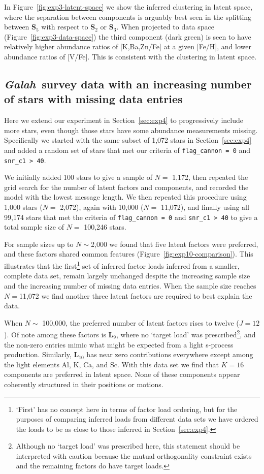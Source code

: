 \documentclass[twocolumn]{aastex62}
\newcommand{\project}[1]{\textsl{#1}}
\newcommand{\Galah}{\project{Galah}}
\newcommand{\factorloads}{\textbf{L}}
\newcommand{\factorscores}{\textbf{S}}
\begin{document}
In Figure~\ref{fig:exp3-latent-space} we show the inferred clustering in latent space,
where the separation between components is arguably best seen in the splitting between $\factorscores_5$ with respect to $\factorscores_2$ or $\factorscores_3$. When projected to data space (Figure~\ref{fig:exp3-data-space}) the third component (dark green) is seen to have relatively higher abundance ratios of [K,Ba,Zn/Fe] at a given [Fe/H],
and lower abundance ratios of [V/Fe]. This is consistent with the clustering in latent space.


\subsection{\Galah\ survey data with an increasing number of stars with missing data entries} \label{sec:exp10}
Here we extend our experiment in Section~\ref{sec:exp4} to progressively
include more stars, even though those stars have some abundance measurements
missing. 
Specifically we started with the same subset of 1,072 stars in Section~\ref{sec:exp4}
and added a random set of stars that met our criteria of \texttt{flag\_cannon = 0} and
\texttt{snr\_c1 > 40}. 


We initially added 100 stars to give a sample of $N =$ 1,172, then repeated
the grid search for the number of latent factors and components, and recorded
the model with the lowest message length. We then repeated this
procedure using 1,000 stars ($N =$ 2,072), again with 10,000 ($N =$ 11,072),
and finally using all 99,174 stars that met the criteria of \texttt{flag\_cannon = 0} and
\texttt{snr\_c1 > 40} to give a total sample size of $N =$ 100,246 stars.

For sample sizes up to $N \sim $2,000 we found that five latent factors were
preferred, and these factors shared common features (Figure~\ref{fig:exp10-comparison}).
This illustrates that the
first\footnote{`First' has no concept here in terms of factor load ordering, but
for the purposes of comparing inferred loads from different data sets we have ordered
the loads to be as close to those inferred in Section~\ref{sec:exp4}.} set of inferred factor
loads inferred from a smaller, complete data set, remain largely unchanged despite the increasing sample size and the increasing number of missing data entries.
When the sample size reaches $N = $11,072 we find another three latent factors are
required to best explain the data.


When $N \sim$ 100,000, the preferred number of latent factors rises to twelve ($J = 12$). Of note among these factors is $\factorloads_9$, where
no `target load' was prescribed\footnote{Although no `target load' was prescribed here, this statement should be interpreted with caution because the mutual orthogonality constraint exists and the remaining factors do have target loads.}, and the non-zero entries mimic what might be expected from a 
light s-process production. Similarly, $\factorloads_{10}$ has near zero contributions
everywhere except among the light elements Al, K, Ca, and Sc. 
With this data set we find that $K = 16$ components are preferred in latent space. None of these components appear coherently structured in their positions or motions.
\end{document}
